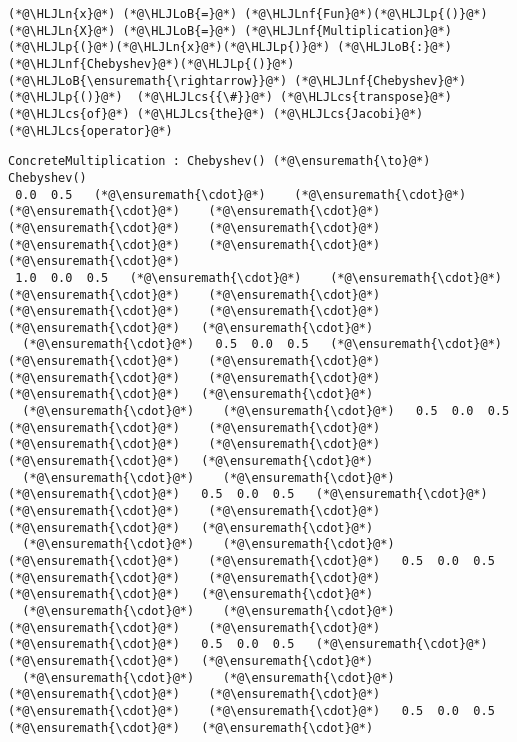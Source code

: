 \documentclass[12pt,landscape]{article}
\newcommand{\HLJLn}[1]{#1}
\newcommand{\HLJLnf}[1]{\textcolor[RGB]{66,102,213}{#1}}
\newcommand{\HLJLoB}[1]{\textcolor[RGB]{102,102,102}{\textbf{#1}}}
\newcommand{\HLJLp}[1]{#1}
\newcommand{\HLJLcs}[1]{\textcolor[RGB]{153,153,119}{\textit{#1}}}
\begin{document}
{\begin{lstlisting}
(*@\HLJLn{x}@*) (*@\HLJLoB{=}@*) (*@\HLJLnf{Fun}@*)(*@\HLJLp{()}@*)
(*@\HLJLn{X}@*) (*@\HLJLoB{=}@*) (*@\HLJLnf{Multiplication}@*)(*@\HLJLp{(}@*)(*@\HLJLn{x}@*)(*@\HLJLp{)}@*) (*@\HLJLoB{:}@*) (*@\HLJLnf{Chebyshev}@*)(*@\HLJLp{()}@*) (*@\HLJLoB{\ensuremath{\rightarrow}}@*) (*@\HLJLnf{Chebyshev}@*)(*@\HLJLp{()}@*)  (*@\HLJLcs{{\#}}@*) (*@\HLJLcs{transpose}@*) (*@\HLJLcs{of}@*) (*@\HLJLcs{the}@*) (*@\HLJLcs{Jacobi}@*) (*@\HLJLcs{operator}@*)
\end{lstlisting}

\begin{lstlisting}
ConcreteMultiplication : Chebyshev() (*@\ensuremath{\to}@*) Chebyshev()
 0.0  0.5   (*@\ensuremath{\cdot}@*)    (*@\ensuremath{\cdot}@*)    (*@\ensuremath{\cdot}@*)    (*@\ensuremath{\cdot}@*)    (*@\ensuremath{\cdot}@*)    (*@\ensuremath{\cdot}@*)    (*@\ensuremath{\cdot}@*)    (*@\ensuremath{\cdot}@*)   (*@\ensuremath{\cdot}@*)
 1.0  0.0  0.5   (*@\ensuremath{\cdot}@*)    (*@\ensuremath{\cdot}@*)    (*@\ensuremath{\cdot}@*)    (*@\ensuremath{\cdot}@*)    (*@\ensuremath{\cdot}@*)    (*@\ensuremath{\cdot}@*)    (*@\ensuremath{\cdot}@*)   (*@\ensuremath{\cdot}@*)
  (*@\ensuremath{\cdot}@*)   0.5  0.0  0.5   (*@\ensuremath{\cdot}@*)    (*@\ensuremath{\cdot}@*)    (*@\ensuremath{\cdot}@*)    (*@\ensuremath{\cdot}@*)    (*@\ensuremath{\cdot}@*)    (*@\ensuremath{\cdot}@*)   (*@\ensuremath{\cdot}@*)
  (*@\ensuremath{\cdot}@*)    (*@\ensuremath{\cdot}@*)   0.5  0.0  0.5   (*@\ensuremath{\cdot}@*)    (*@\ensuremath{\cdot}@*)    (*@\ensuremath{\cdot}@*)    (*@\ensuremath{\cdot}@*)    (*@\ensuremath{\cdot}@*)   (*@\ensuremath{\cdot}@*)
  (*@\ensuremath{\cdot}@*)    (*@\ensuremath{\cdot}@*)    (*@\ensuremath{\cdot}@*)   0.5  0.0  0.5   (*@\ensuremath{\cdot}@*)    (*@\ensuremath{\cdot}@*)    (*@\ensuremath{\cdot}@*)    (*@\ensuremath{\cdot}@*)   (*@\ensuremath{\cdot}@*)
  (*@\ensuremath{\cdot}@*)    (*@\ensuremath{\cdot}@*)    (*@\ensuremath{\cdot}@*)    (*@\ensuremath{\cdot}@*)   0.5  0.0  0.5   (*@\ensuremath{\cdot}@*)    (*@\ensuremath{\cdot}@*)    (*@\ensuremath{\cdot}@*)   (*@\ensuremath{\cdot}@*)
  (*@\ensuremath{\cdot}@*)    (*@\ensuremath{\cdot}@*)    (*@\ensuremath{\cdot}@*)    (*@\ensuremath{\cdot}@*)    (*@\ensuremath{\cdot}@*)   0.5  0.0  0.5   (*@\ensuremath{\cdot}@*)    (*@\ensuremath{\cdot}@*)   (*@\ensuremath{\cdot}@*)
  (*@\ensuremath{\cdot}@*)    (*@\ensuremath{\cdot}@*)    (*@\ensuremath{\cdot}@*)    (*@\ensuremath{\cdot}@*)    (*@\ensuremath{\cdot}@*)    (*@\ensuremath{\cdot}@*)   0.5  0.0  0.5   (*@\ensuremath{\cdot}@*)   (*@\ensuremath{\cdot}@*)

\end{lstlisting}}
\end{document}
